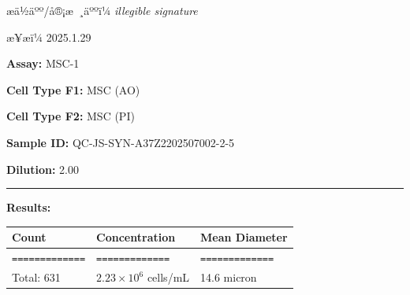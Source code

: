 \documentclass[UTF8,10pt,a4paper,fontset=fandol]{ctexart}
\renewcommand{\arraystretch}{1.15}
\newcommand{\fieldvalue}[1]{#1}
\newcommand{\handwritten}[1]{#1}
\begin{document}
\begin{center}
\begin{center}
\medskip

\noindent
\begin{minipage}[t]{0.48\textwidth}
\centering
\fbox{\rule{0pt}{0.25\textheight}\rule{0.95\linewidth}{0pt}}
\end{minipage}
\hfill
\begin{minipage}[t]{0.48\textwidth}
\centering
\fbox{\rule{0pt}{0.25\textheight}\rule{0.95\linewidth}{0pt}}
\end{minipage}

\vfill

\noindent æä½äºº/å®¡æ ¸äººï¼
\handwritten{\textit{illegible signature}}

\hfill
æ¥æï¼
\handwritten{2025.1.29}

\newpage

\noindent\textbf{Assay:} 
\fieldvalue{MSC-1}

\medskip
\noindent\textbf{Cell Type F1:} 
\fieldvalue{MSC (AO)}

\noindent\textbf{Cell Type F2:} 
\fieldvalue{MSC (PI)}

\medskip
\noindent\textbf{Sample ID:} 
\fieldvalue{QC-JS-SYN-A37Z2202507002-2-5}

\noindent\textbf{Dilution:} 
\fieldvalue{2.00}

\medskip
\noindent\rule{\textwidth}{0.4pt}

\noindent\textbf{Results:}

\medskip
\renewcommand{\arraystretch}{1.15}
\begin{tabularx}{\textwidth}{@{}X X X@{}}
\textbf{Count} & \textbf{Concentration} & \textbf{Mean Diameter} \\
\hline
\texttt{=============} & \texttt{=============} & \texttt{=============} \\

Total:
\fieldvalue{631}
&
\fieldvalue{$2.23\times10^{6}$ cells/mL}
&
\fieldvalue{14.6 micron}
\\


\end{tabularx}
\end{center}
\end{center}
\end{document}
